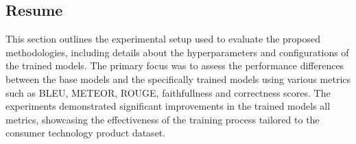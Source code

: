 \subsection{Resume}
This section outlines the experimental setup used to evaluate the proposed methodologies, including details about the hyperparameters and configurations of the trained models. The primary focus was to assess the performance differences between the base models and the specifically trained models using various metrics such as BLEU, METEOR, ROUGE, faithfullness and correctness scores. The experiments demonstrated significant improvements in the trained models all metrics, showcasing the effectiveness of the training process tailored to the consumer technology product dataset.